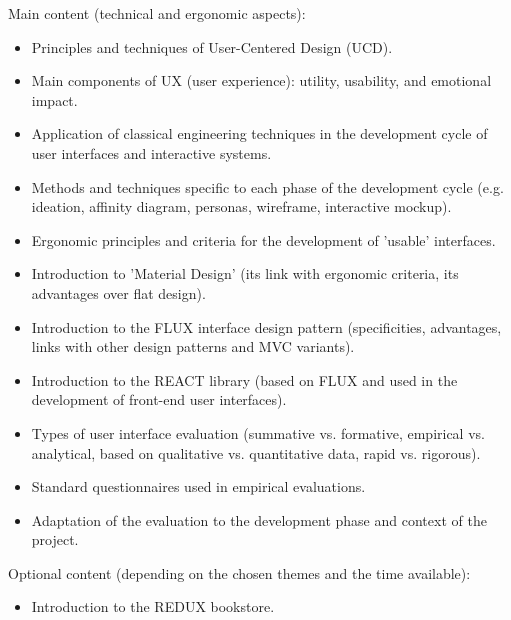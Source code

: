 Main content (technical and ergonomic aspects):
\begin{itemize}
    \item Principles and techniques of User-Centered Design (UCD).
    \item Main components of UX (user experience): utility, usability, and emotional impact.
    \item Application of classical engineering techniques in the development cycle of user interfaces and interactive systems.
    \item Methods and techniques specific to each phase of the development cycle (e.g. ideation, affinity diagram, personas, wireframe, interactive mockup).
    \item Ergonomic principles and criteria for the development of 'usable' interfaces.
    \item Introduction to 'Material Design' (its link with ergonomic criteria, its advantages over flat design).
    \item Introduction to the FLUX interface design pattern (specificities, advantages, links with other design patterns and MVC variants).
    \item Introduction to the REACT library (based on FLUX and used in the development of front-end user interfaces).
    \item Types of user interface evaluation (summative vs. formative, empirical vs. analytical, based on qualitative vs. quantitative data, rapid vs. rigorous).
    \item Standard questionnaires used in empirical evaluations.
    \item Adaptation of the evaluation to the development phase and context of the project.
\end{itemize}
Optional content (depending on the chosen themes and the time available):
\begin{itemize}
    \item Introduction to the REDUX bookstore.
\end{itemize}